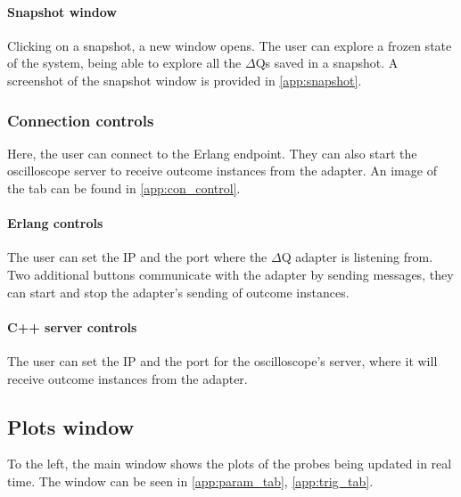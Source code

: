     \paragraph{Snapshot window}
        Clicking on a snapshot, a new window opens. The user can explore a frozen state of the system, being able to explore all the $\Delta$Qs saved in a snapshot. A screenshot of the snapshot window is provided in \cref{app:snapshot}.
   \subsubsection{Connection controls}
    
        Here, the user can connect to the Erlang endpoint. They can also start the oscilloscope server to receive outcome instances from the adapter. An image of the tab can be found in \cref{app:con_control}.

        \paragraph{Erlang controls}
            The user can set the IP and the port where the $\Delta$Q adapter is listening from. Two additional buttons communicate with the adapter by sending messages, they can start and stop the adapter's sending of outcome instances.
        
        \paragraph{C++ server controls}
            The user can set the IP and the port for the oscilloscope's server, where it will receive outcome instances from the adapter.

\subsection{Plots window}
        To the left, the main window shows the plots of the probes being updated in real time. The window can be seen in \cref{app:param_tab}, \cref{app:trig_tab}.
